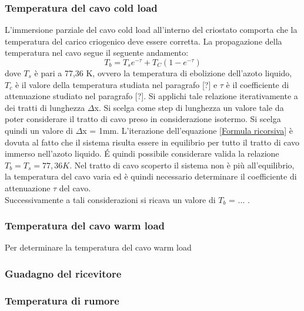 \subsubsection{Temperatura del cavo cold load}
L'immersione parziale del cavo cold load all'interno del criostato comporta che la temperatura del carico criogenico deve essere corretta. La propagazione della temperatura nel cavo segue il seguente andamento:
\begin{equation}
T_{b}= T_{s}e^{-\tau} + T_{C}(1-e^{-\tau})
\label{Formula ricorsiva}
\end{equation}
dove $T_{s}$ è pari a 77,36 K, ovvero la temperatura di ebolizione dell'azoto liquido, $T_{c}$ è il valore della temperatura studiata nel paragrafo [?] e $\tau$ è il coefficiente di attenuazione studiato nel paragrafo [?].
Si applichi tale relazione iterativamente a dei tratti di lunghezza $\Delta$x. Si scelga come step di lunghezza un valore tale da poter considerare il tratto di cavo preso in considerazione isotermo. Si scelga quindi un valore di $\Delta$x = 1mm.
L'iterazione dell'equazione \eqref{Formula ricorsiva} è dovuta al fatto che il sistema risulta essere in equilibrio per tutto il tratto di cavo immerso nell'azoto liquido. \'E quindi possibile considerare valida la relazione $T_{b} = T_{s} = 77,36 K$. Nel tratto di cavo scoperto il sistema non è più all'equilibrio, la temperatura del cavo varia ed è quindi necessario determinare il coefficiente di attenuazione $\tau$ del cavo.\\
Successivamente a tali considerazioni si ricava un valore di $T_{b}$ = ... .

\subsubsection{Temperatura del cavo warm load}
Per determinare la temperatura del cavo warm load
\subsubsection{Guadagno del ricevitore}
\subsubsection{Temperatura di rumore}